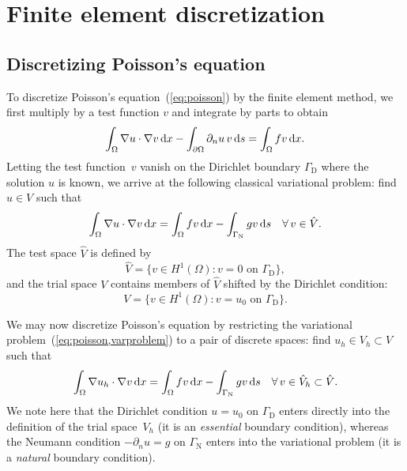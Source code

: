 \section{Finite element discretization}

\subsection{Discretizing Poisson's equation}

To discretize Poisson's equation~(\ref{eq:poisson}) by the finite
element method, we first multiply by a test function $v$ and integrate
by parts to obtain
\begin{equation}
  \int_{\Omega} \nabla u \cdot \nabla v \, \mathrm{d}x
  - \int_{\partial \Omega} \partial_n u \, v \, \mathrm{d}s
  =
  \int_{\Omega} f v \, \mathrm{d}x.
\end{equation}
Letting the test function~$v$ vanish on the Dirichlet boundary
$\Gamma_{\mathrm{D}}$ where the solution $u$ is known, we arrive at
the following classical variational problem: find $u \in V$ such that
\begin{equation} \label{eq:poisson,varproblem}
  \int_{\Omega} \nabla u \cdot \nabla v \, \mathrm{d}x =
  \int_{\Omega} f v \, \mathrm{d}x - \int_{\Gamma_{\mathrm{N}}} g v \, \mathrm{d}s
  \quad \forall\, v \in \hat{V}.
\end{equation}
The test space $\hat{V}$ is defined by
\begin{equation}
  \hat{V} = \{v \in H^1(\Omega) : v = 0 \mbox{ on } \Gamma_{\mathrm{D}}\},
\end{equation}
and the trial space \( V \) contains members of \( \hat{V} \) shifted
by the Dirichlet condition:
\begin{equation}
  V = \{ v \in H^1(\Omega) : v = u_0 \mbox{ on } \Gamma_{\mathrm{D}} \}.
\end{equation}


We may now discretize Poisson's equation by restricting the
variational problem~(\ref{eq:poisson,varproblem}) to a pair of
discrete spaces: find $u_h \in V_h \subset V$ such that
\begin{equation} \label{eq:poisson,varproblem,discrete}
  \int_{\Omega} \nabla u_h \cdot \nabla v \, \mathrm{d}x =
  \int_{\Omega} f v \, \mathrm{d}x - \int_{\Gamma_{\mathrm{N}}} g v \, \mathrm{d}s
  \quad \forall\, v \in \hat{V}_h \subset \hat{V}.
\end{equation}
We note here that the Dirichlet condition $u = u_0$ on
$\Gamma_{\mathrm{D}}$ enters directly into the definition of the trial
space~$V_h$ (it is an \emph{essential} boundary condition), whereas
the Neumann condition $-\partial_n u = g$ on $\Gamma_{\mathrm{N}}$
enters into the variational problem (it is a \emph{natural} boundary
condition).


